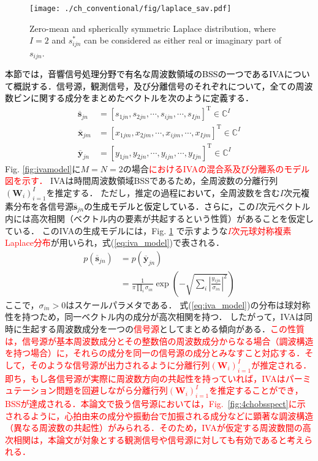 \begin{figure}[t]
\centering
\texttt{[image: ./ch\_conventional/fig/laplace\_sav.pdf]}
\caption{Zero-mean and spherically symmetric Laplace distribution, where $I=2$ and $s^*_{ijn}$ can be considered as either real or imaginary part of $s_{ijn}$.}
\label{fig:laplace}
\end{figure}
\textcolor{black}{本節では，音響信号処理分野で有名な周波数領域のBSSの一つであるIVAについて概説する．信号源，観測信号，及び分離信号のそれぞれについて，全ての周波数ビンに関する成分をまとめたベクトルを次のように定義する．}
\begin{align}
    \overline{\bm{s}}_{jn} &= [s_{1jn}, s_{2jn}, \cdots, s_{ijn}, \cdots, s_{Ijn} ]^{\mathrm{T}} \in \mathbb{C}^{I} \\
    \overline{\bm{x}}_{jm} &= [x_{1jm}, x_{2jm}, \cdots, x_{ijm}, \cdots, x_{Ijm} ]^{\mathrm{T}} \in \mathbb{C}^{I} \\
    \overline{\bm{y}}_{jn} &= [y_{1jn}, y_{2jn}, \cdots, y_{ijn}, \cdots, y_{Ijn} ]^{\mathrm{T}} \in \mathbb{C}^{I}
\end{align}
Fig. \ref{fig:ivamodel}に$M=N=2$の場合\textcolor{red}{におけるIVAの混合系及び分離系のモデル図を示す．}
IVAは時間周波数領域BSSであるため，全周波数の分離行列$( \bm{W}_i )_{i=1}^I$を推定する．
ただし，推定の過程\textcolor{black}{において，}全周波数を含む$I$次元\textcolor{black}{複素}分布を各信号源\textcolor{black}{$\overline{\bm{s}}_{jn}$の生成モデルと仮定している．さらに，この}$I$次元ベクトル内には高次相関（ベクトル内の要素が共起するという性質）があることを仮定している．
このIVAの生成モデルには，Fig. \ref{fig:laplace} で示すような\textcolor{red}{$I$次元球対称複素Laplace分布}が用いられ，式(\ref{eq:iva_model})で表される．
\begin{align}
  \nonumber p(\overline{\bm{s}}_{jn}) &= p(\overline{\bm{y}}_{jn}) \\
&= \frac{1}{\pi \prod_{i} \sigma_{in}} \exp \left(  - \sqrt{ \sum_i \left| \frac{y_{ijn}}{\sigma_{in}} \right|^2}  \right)
\label{eq:iva_model}    
\end{align}
ここで，$\sigma_{in}>0$はスケールパラメタである．
式(\ref{eq:iva_model})の分布は球対称性を持つため，同一ベクトル内の成分が高次相関を持つ\cite{Kim2007_iva}．
したがって，IVAは同時に生起する周波数成分を一つの\textcolor{red}{信号源}としてまとめる傾向がある．\textcolor{red}{この性質は，信号源が基本周波数成分とその整数倍の周波数成分からなる場合（調波構造を持つ場合）に，それらの成分を同一の信号源の成分とみなすこと対応する．そして，そのような信号源が出力されるように分離行列$( \bm{W}_i )_{i=1}^I$が推定される．即ち，もし各信号源が実際に周波数方向の共起性を持っていれば，IVAはパーミュテーション問題を回避しながら分離行列$( \bm{W}_i )_{i=1}^I$を推定することができ，BSSが達成される．本論文で扱う信号源においては，Fig.~\ref{fig:4chobsspect}に示されるように，心拍由来の成分や振動台で加振される成分などに顕著な調波構造（異なる周波数の共起性）がみられる．そのため，IVAが仮定する周波数間の高次相関は，本論文が対象とする観測信号や信号源に対しても有効であると考えられる．}

